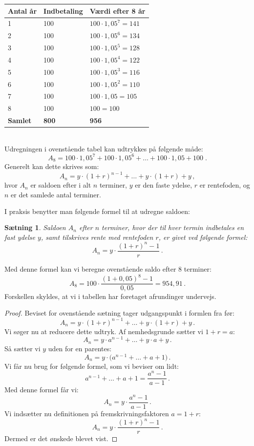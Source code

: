 \documentclass[12pt,oneside,a4paper]{article}
\newtheorem{thm}{Sætning}[section]
\begin{document}
\begin{tabular}{|l|l|l|}
    \hline
    \textbf{Antal år} & \textbf{Indbetaling} & \textbf{Værdi efter 8 år} \\
    \hline
    1 & 100 & $100 \cdot 1,05^7 = 141$ \\
    \hline
    2 & 100 & $100 \cdot 1,05^6 = 134$ \\
    \hline
    3 & 100 & $100 \cdot 1,05^5 = 128$ \\
    \hline
    4 & 100 & $100 \cdot 1,05^4 = 122$ \\
    \hline
    5 & 100 & $100 \cdot 1,05^3 = 116$ \\
    \hline
    6 & 100 & $100 \cdot 1,05^2 = 110$ \\
    \hline
    7 & 100 & $100 \cdot 1,05 = 105$ \\
    \hline
    8 & 100 & $100 = 100$ \\
    \hline
    \textbf{Samlet} & \textbf{800} & \textbf{956} \\
    \hline
\end{tabular}
\\

Udregningen i ovenstående tabel kan udtrykkes på følgende måde:
\[
A_8 = 100\cdot 1,05^7 + 100 \cdot 1,05^6 + \ldots + 100 \cdot 1,05 + 100 \;.
\]
Generelt kan dette skrives som:
\[
A_n = y\cdot(1+r)^{n-1} + \ldots + y\cdot(1+r) + y \,,
\]
hvor $A_n$ er saldoen efter i alt $n$ terminer,  $y$ er den faste
ydelse, $r$ er rentefoden, og $n$ er det samlede antal terminer.

I praksis benytter man følgende formel til at udregne saldoen:
\begin{tcolorbox}
\begin{thm}
Saldoen $A_n$ efter $n$ terminer, hvor der til hver termin indbetales en fast ydelse $y$,
samt tilskrives rente med rentefoden $r$, er givet ved følgende formel:
\[
A_n = y\cdot\frac{(1+r)^n-1}{r}\,.
\]
\end{thm}
\end{tcolorbox}

Med denne formel kan vi beregne ovenstående saldo efter 8 terminer:
\[
A_8 = 100\cdot\frac{(1+0,05)^8-1}{0,05} = 954,91 \,.
\]
Forskellen skyldes, at vi i tabellen har foretaget afrundinger undervejs.


\begin{tcolorbox}
\begin{proof}
Beviset for ovenstående sætning tager udgangspunkt i formlen fra før:
\[
A_n = y\cdot(1+r)^{n-1} + \ldots + y\cdot(1+r) + y \,.
\]
Vi søger nu at reducere dette udtryk.  Af nemhedsgrunde sætter vi $1+r = a$:
\[
A_n = y\cdot a^{n-1} + \ldots + y\cdot a + y \,.
\]
Så sætter vi $y$ uden for en parentes:
\[
A_n = y\cdot\big(a^{n-1} + \ldots + a + 1\big) \,.
\]
Vi får nu brug for følgende formel, som vi beviser om lidt:
\[
    a^{n-1} + \ldots + a + 1 = \frac{a^{n} - 1}{a-1} \,.
\]
Med denne formel får vi:
\[
A_n = y\cdot\frac{a^{n} - 1}{a-1} \,.
\]
Vi indsætter nu definitionen på fremskrivningsfaktoren $a=1+r$:
\[
A_n = y\cdot\frac{(1+r)^{n} - 1}{r} \,.
\]
Dermed er det ønskede blevet vist.
\end{proof}
\end{tcolorbox}
\end{document}
